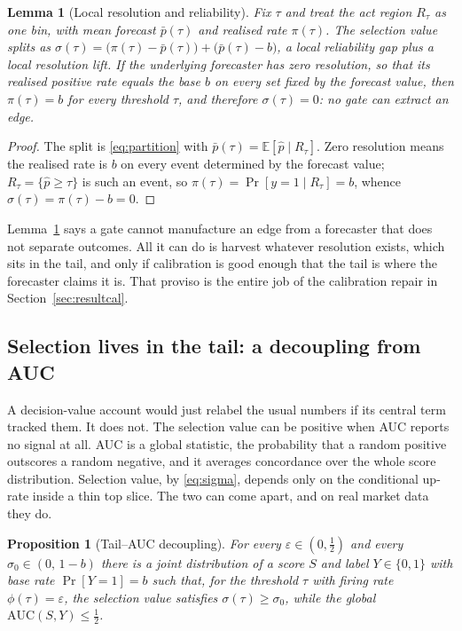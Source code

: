 \documentclass{sbc2023}%
\theoremstyle{definition}
\theoremstyle{plain}
\newtheorem{proposition}{Proposition}
\newtheorem{lemma}{Lemma}
\newcommand{\Pup}{\hat p}
\begin{document}
\begin{lemma}[Local resolution and reliability]
\label{lem:res}
Fix $\tau$ and treat the act region $R_\tau$ as one bin, with mean forecast
$\bar p(\tau)$ and realised rate $\pi(\tau)$. The selection value splits as
$\sigma(\tau)=\big(\pi(\tau)-\bar p(\tau)\big)+\big(\bar p(\tau)-b\big)$, a local
reliability gap plus a local resolution lift. If the underlying forecaster has zero
resolution, so that its realised positive rate equals the base $b$ on every set fixed
by the forecast value, then $\pi(\tau)=b$ for every threshold $\tau$, and therefore
$\sigma(\tau)=0$: no gate can extract an edge.
\end{lemma}
\begin{proof}
The split is \eqref{eq:partition} with $\bar p(\tau)=\mathbb{E}[\Pup\mid R_\tau]$. Zero
resolution means the realised rate is $b$ on every event determined by the forecast
value; $R_\tau=\{\Pup\ge\tau\}$ is such an event, so $\pi(\tau)=\Pr[y=1\mid R_\tau]=b$,
whence $\sigma(\tau)=\pi(\tau)-b=0$.
\end{proof}

Lemma~\ref{lem:res} says a gate cannot manufacture an edge from a forecaster that does
not separate outcomes. All it can do is harvest whatever resolution exists, which sits
in the tail, and only if calibration is good enough that the tail is where the
forecaster claims it is. That proviso is the entire job of the calibration repair in
Section~\ref{sec:resultcal}.

\subsection{Selection lives in the tail: a decoupling from AUC}
\label{sec:tail}
A decision-value account would just relabel the usual numbers if its central term
tracked them. It does not. The selection value can be positive when AUC reports no
signal at all. AUC is a global statistic, the probability that a random positive
outscores a random negative, and it averages concordance over the whole score
distribution. Selection value, by \eqref{eq:sigma}, depends only on the conditional
up-rate inside a thin top slice. The two can come apart, and on real market data they
do.

\begin{proposition}[Tail--AUC decoupling]
\label{prop:tail}
For every $\varepsilon\in(0,\tfrac12)$ and every $\sigma_0\in(0,\,1-b)$ there is a
joint distribution of a score $S$ and label $Y\in\{0,1\}$ with base rate
$\Pr[Y=1]=b$ such that, for the threshold $\tau$ with firing rate $\phi(\tau)=\varepsilon$,
the selection value satisfies $\sigma(\tau)\ge\sigma_0$, while the global
$\mathrm{AUC}(S,Y)\le \tfrac12$.
\end{proposition}
\end{document}
